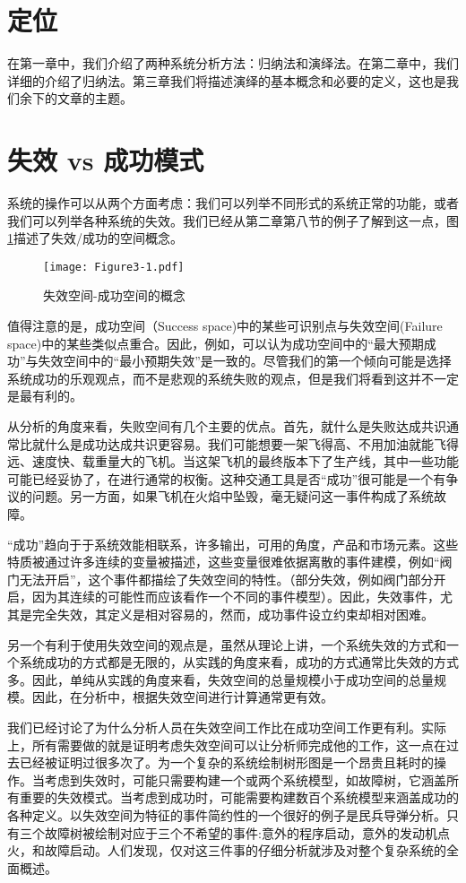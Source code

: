 \documentclass[cn,11pt,chinese]{elegantbook}
\begin{document}
\section{定位}

在第一章中，我们介绍了两种系统分析方法：归纳法和演绎法。在第二章中，我们详细的介绍了归纳法。第三章我们将描述演绎的基本概念和必要的定义，这也是我们余下的文章的主题。

\section{失效 vs 成功模式}

系统的操作可以从两个方面考虑：我们可以列举不同形式的系统正常的功能，或者我们可以列举各种系统的失效。我们已经从第二章第八节的例子了解到这一点，图\ref{fig:fig3_1}描述了失效/成功的空间概念。

\begin{figure}[h]
	\centering
	\texttt{[image: Figure3-1.pdf]}
		\caption{失效空间-成功空间的概念}\label{fig:fig3_1}
\end{figure}

值得注意的是，成功空间（Success space)中的某些可识别点与失效空间(Failure space)中的某些类似点重合。因此，例如，可以认为成功空间中的“最大预期成功”与失效空间中的“最小预期失效”是一致的。尽管我们的第一个倾向可能是选择系统成功的乐观观点，而不是悲观的系统失败的观点，但是我们将看到这并不一定是最有利的。

从分析的角度来看，失败空间有几个主要的优点。首先，就什么是失败达成共识通常比就什么是成功达成共识更容易。我们可能想要一架飞得高、不用加油就能飞得远、速度快、载重量大的飞机。当这架飞机的最终版本下了生产线，其中一些功能可能已经妥协了，在进行通常的权衡。这种交通工具是否“成功”很可能是一个有争议的问题。另一方面，如果飞机在火焰中坠毁，毫无疑问这一事件构成了系统故障。

“成功”趋向于于系统效能相联系，许多输出，可用的角度，产品和市场元素。这些特质被通过许多连续的变量被描述，这些变量很难依据离散的事件建模，例如“阀门无法开启”，这个事件都描绘了失效空间的特性。（部分失效，例如阀门部分开启，因为其连续的可能性而应该看作一个不同的事件模型）。因此，失效事件，尤其是完全失效，其定义是相对容易的，然而，成功事件设立约束却相对困难。

另一个有利于使用失效空间的观点是，虽然从理论上讲，一个系统失效的方式和一个系统成功的方式都是无限的，从实践的角度来看，成功的方式通常比失效的方式多。因此，单纯从实践的角度来看，失效空间的总量规模小于成功空间的总量规模。因此，在分析中，根据失效空间进行计算通常更有效。

我们已经讨论了为什么分析人员在失效空间工作比在成功空间工作更有利。实际上，所有需要做的就是证明考虑失效空间可以让分析师完成他的工作，这一点在过去已经被证明过很多次了。为一个复杂的系统绘制树形图是一个昂贵且耗时的操作。当考虑到失效时，可能只需要构建一个或两个系统模型，如故障树，它涵盖所有重要的失效模式。当考虑到成功时，可能需要构建数百个系统模型来涵盖成功的各种定义。以失效空间为特征的事件简约性的一个很好的例子是民兵导弹分析。只有三个故障树被绘制对应于三个不希望的事件:意外的程序启动，意外的发动机点火，和故障启动。人们发现，仅对这三件事的仔细分析就涉及对整个复杂系统的全面概述。
\end{document}
